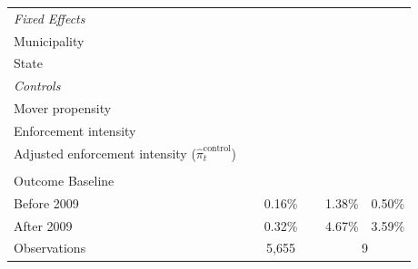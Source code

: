 \documentclass[12pt]{article}
\begin{document}
\begin{center}
\begin{threeparttable}[b]
\begin{tabular}{l*{8}c}
\textit{Fixed Effects} \\
\quad Municipality & \cellcolor{green!50} &  & \cellcolor{green!50} & \cellcolor{green!50} & \cellcolor{green!50}\\
\quad State  & & \cellcolor{green!50}  \\
\textit{Controls} \\
\quad Mover propensity & & & \cellcolor{green!50} & \cellcolor{green!50} & \cellcolor{green!50}    \\ 
\quad Enforcement intensity  & & & & & \cellcolor{green!50} \\ 
\quad Adjusted enforcement intensity ($\widehat{\pi}_t^{\text{control}}$) & & & & & & \cellcolor{green!50} \\ 
& \\
Outcome Baseline \\ 
\quad Before 2009 &   \multicolumn{6}{c}{0.16\%} & 1.38\% & 0.50\% \\ 
\quad After 2009  &   \multicolumn{6}{c}{0.32\%} & 4.67\% & 3.59\% \\ 
Observations & \multicolumn{6}{c}{5,655} & \multicolumn{2}{c}{9} \\
   \midrule \midrule
	\end{tabular}
			\begin{tablenotes}[flushleft]

\end{tablenotes}
\end{threeparttable}
\end{center}
\end{document}
